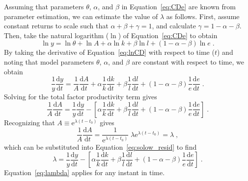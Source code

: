 \documentclass[preprint,authoryear,12pt]{elsarticle}\usepackage[]{graphicx}\usepackage[]{color}
\begin{document}
Assuming that parameters $\theta$, $\alpha$, and $\beta$
in Equation~\ref{eq:CDe} are known from parameter estimation,
we can estimate the value of $\lambda$ as follows.
First, assume constant returns to scale such that 
$\alpha + \beta + \gamma = 1$, 
and calculate $\gamma = 1 - \alpha - \beta$.
Then, take the natural logarithm ($\ln$) of Equation~\ref{eq:CDe} to obtain
%
\begin{equation} \label{eq:lnCD}
  \ln y = \ln \theta + \ln A + \alpha \ln k + \beta \ln l + (1 - \alpha - \beta) \ln e \;.
\end{equation}
%
By taking the derivative of Equation~\ref{eq:lnCD} with respect to time ($t$) 
and noting that model parameters $\theta$, $\alpha$, and $\beta$ are 
constant with respect to time, we obtain
%
\begin{equation} \label{eq:ddtlnCD}
  \frac{1}{y}\frac{\mathrm{d}y}{\mathrm{d}t} 
      = \frac{1}{A}\frac{\mathrm{d}A}{\mathrm{d}t} 
      + \alpha \frac{1}{k}\frac{\mathrm{d}k}{\mathrm{d}t} 
      + \beta \frac{1}{l}\frac{\mathrm{d}l}{\mathrm{d}t} 
      + (1 - \alpha - \beta) \frac{1}{e}\frac{\mathrm{d}e}{\mathrm{d}t} \;.
\end{equation}
%
Solving for the total factor productivity term gives
%
\begin{equation} \label{eq:solow_resid}
  \frac{1}{A}\frac{\mathrm{d}A}{\mathrm{d}t} 
      = \frac{1}{y}\frac{\mathrm{d}y}{\mathrm{d}t} 
      - \left[
              \alpha \frac{1}{k}\frac{\mathrm{d}k}{\mathrm{d}t} 
              + \beta \frac{1}{l}\frac{\mathrm{d}l}{\mathrm{d}t} 
              + (1 - \alpha - \beta) \frac{1}{e}\frac{\mathrm{d}e}{\mathrm{d}t} 
        \right] \;.
\end{equation}
%
Recognizing that $A \equiv \mathrm{e}^{\lambda (t-t_0)}$ gives
%
\begin{equation} \label{eq:lambda_calc}
  \frac{1}{A}\frac{\mathrm{d}A}{\mathrm{d}t} 
    = \frac{1}{\mathrm{e}^{\lambda (t-t_0)}} \; \lambda \mathrm{e}^{\lambda (t-t_0)}
    = \lambda \; ,
\end{equation}
%
which can be substituted into Equation~\ref{eq:solow_resid} to find
%
\begin{equation} \label{eq:lambda}
  \lambda 
    = \frac{1}{y}\frac{\mathrm{d}y}{\mathrm{d}t} 
    - \left[
              \alpha \frac{1}{k}\frac{\mathrm{d}k}{\mathrm{d}t} 
              + \beta \frac{1}{l}\frac{\mathrm{d}l}{\mathrm{d}t} 
              + (1 - \alpha - \beta) \frac{1}{e}\frac{\mathrm{d}e}{\mathrm{d}t} 
      \right] \;.
\end{equation}
%
Equation~\ref{eq:lambda} applies for any instant in time.
\end{document}
